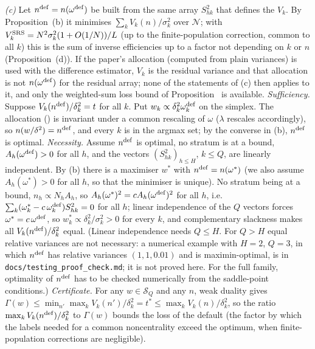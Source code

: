 \emph{(c)} Let $n^{\rm def}=n(\omega^{\rm def})$ be built from the same array $S^2_{hk}$ that defines the $V_k$. By Proposition~(b) it minimises $\sum_kV_k(n)/\sigma_k^2$ over $\mathcal N$; with $V^{\rm SRS}_k=N^2\sigma_k^2(1+O(1/N))/L$ (up to the finite-population correction, common to all $k$) this is the sum of inverse efficiencies up to a factor not depending on $k$ or $n$ (Proposition~(d)). If the paper's allocation (computed from plain variances) is used with the difference estimator, $V_k$ is the residual variance and that allocation is not $n(\omega^{\rm def})$ for the residual array; none of the statements of (c) then applies to it, and only the weighted-sum loss bound of Proposition~ is available. \emph{Sufficiency.} Suppose $V_k(n^{\rm def})/\delta_k^2=t$ for all $k$. Put $w_k\propto\delta_k^2\omega^{\rm def}_k$ on the simplex. The allocation () is invariant under a common rescaling of $\omega$ ($\lambda$ rescales accordingly), so $n(w/\delta^2)=n^{\rm def}$, and every $k$ is in the argmax set; by the converse in (b), $n^{\rm def}$ is optimal. \emph{Necessity.} Assume $n^{\rm def}$ is optimal, no stratum is at a bound, $A_h(\omega^{\rm def})>0$ for all $h$, and the vectors $(S^2_{hk})_{h\le H}$, $k\le Q$, are linearly independent. By (b) there is a maximiser $w^\ast$ with $n^{\rm def}=n(\omega^\ast)$ (we also assume $A_h(\omega^\ast)>0$ for all $h$, so that the minimiser is unique). No stratum being at a bound, $n_h\propto N_hA_h$, so $A_h(\omega^\ast)^2=cA_h(\omega^{\rm def})^2$ for all $h$, i.e.\ $\sum_k(\omega^\ast_k-c\,\omega^{\rm def}_k)S^2_{hk}=0$ for all $h$; linear independence of the $Q$ vectors forces $\omega^\ast=c\,\omega^{\rm def}$, so $w^\ast_k\propto\delta_k^2/\sigma_k^2>0$ for every $k$, and complementary slackness makes all $V_k(n^{\rm def})/\delta_k^2$ equal. (Linear independence needs $Q\le H$. For $Q>H$ equal relative variances are not necessary: a numerical example with $H=2$, $Q=3$, in which $n^{\rm def}$ has relative variances $(1,1,0.01)$ and is maximin-optimal, is in \texttt{docs/testing\_proof\_check.md}; it is not proved here. For the full family, optimality of $n^{\rm def}$ has to be checked numerically from the saddle-point conditions.) \emph{Certificate.} For any $w\in\mathcal S_Q$ and any $n$, weak duality gives $\Gamma(w)\le\min_{n'}\max_kV_k(n')/\delta_k^2=t^\ast\le\max_kV_k(n)/\delta_k^2$, so the ratio $\max_kV_k(n^{\rm def})/\delta_k^2$ to $\Gamma(w)$ bounds the loss of the default (the factor by which the labels needed for a common noncentrality exceed the optimum, when finite-population corrections are negligible).

